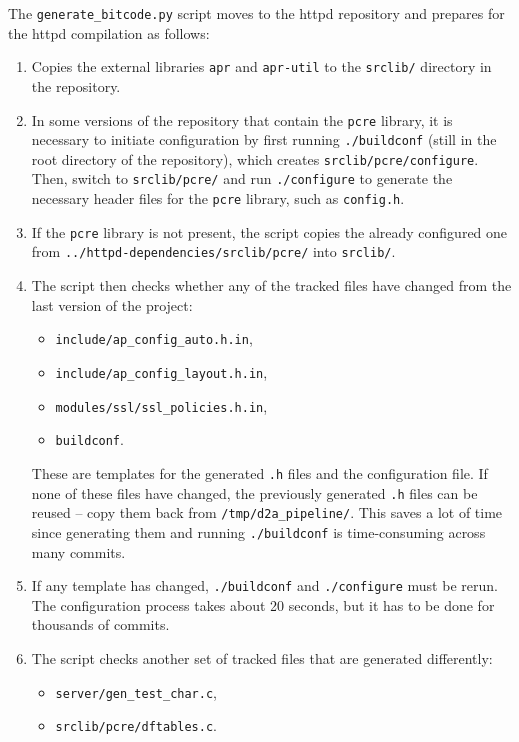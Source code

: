 The \texttt{generate\_bitcode.py} script moves to the httpd repository and prepares for the httpd compilation as follows:
\begin{enumerate}
    \item Copies the external libraries \texttt{apr} and \texttt{apr-util} to the \texttt{srclib/} directory in the repository.
    \item In some versions of the repository that contain the \texttt{pcre} library, it is necessary to initiate configuration by first running \texttt{./buildconf} (still in the root directory of the repository), which creates \texttt{srclib/pcre/configure}. Then, switch to \texttt{srclib/pcre/} and run \texttt{./configure} to generate the necessary header files for the \texttt{pcre} library, such as \texttt{config.h}.
    \item If the \texttt{pcre} library is not present, the script copies the already configured one from \texttt{../httpd-dependencies/srclib/pcre/} into \texttt{srclib/}.
    \item The script then checks whether any of the tracked files have changed from the last version of the project:
    \begin{itemize}
        \item \texttt{include/ap\_config\_auto.h.in},
        \item \texttt{include/ap\_config\_layout.h.in},
        \item \texttt{modules/ssl/ssl\_policies.h.in},
        \item \texttt{buildconf}.
    \end{itemize}
    These are templates for the generated \texttt{.h} files and the configuration file. If none of these files have changed, the previously generated \texttt{.h} files can be reused -- copy them back from \texttt{/tmp/d2a\_pipeline/}. This saves a lot of time since generating them and running \texttt{./buildconf} is time-consuming across many commits.
    \item If any template has changed, \texttt{./buildconf} and \texttt{./configure} must be rerun. The configuration process takes about 20 seconds, but it has to be done for thousands of commits.
    \item The script checks another set of tracked files that are generated differently:
    \begin{itemize}
        \item \texttt{server/gen\_test\_char.c},
        \item \texttt{srclib/pcre/dftables.c}.

\end{itemize}
\end{enumerate}
